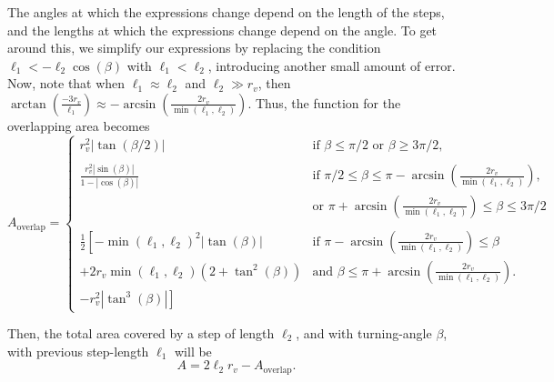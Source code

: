 The angles at which the expressions change depend on the length of the steps, and the lengths at which the expressions change depend on the angle. To get around this, we simplify our expressions by replacing the condition $\ell_1 < -\ell_2 \cos(\beta)$ with $\ell_1 < \ell_2$, introducing another small amount of error. Now, note that when $\ell_1 \approx \ell_2$ and $\ell_2 \gg r_v$, then $\arctan\left( \frac{-3r_v}{\ell_1}\right) \approx -\arcsin\left( \frac{2r_v}{\min(\ell_1,\ell_2)} \right)$. Thus, the function for the overlapping area becomes
\begin{equation*}
A_{\text{overlap}} = 
\begin{cases}
r_v^2 \left|\tan(\beta/2)\right| \quad &\text{if } \beta \leq \pi/2 \text{ or } \beta \geq 3\pi/2,\\\\
\displaystyle \frac{r_v^2 \left|\sin(\beta)\right|}{1-\left|\cos(\beta) \right|} &\text{if } \pi/2  \leq \beta \leq  \pi-\arcsin\left( \frac{2r_v}{\min(\ell_1,\ell_2)} \right),\\
&\text{or }\pi+\arcsin\left( \frac{2r_v}{\min(\ell_1,\ell_2)} \right) \leq \beta \leq 3\pi/2\\\\
\displaystyle \frac{1}{2} \left[-\min(\ell_1,\ell_2)^2 \left|\tan(\beta)\right| \right. &\text{if }\pi-\arcsin\left( \frac{2r_v}{\min(\ell_1,\ell_2)} \right) \leq \beta\\
\left.+ 2r_v \min(\ell_1,\ell_2)(2+\tan^2(\beta))\right.  &\text{and } \beta \leq \pi +\arcsin\left( \frac{2r_v}{\min(\ell_1,\ell_2)} \right).\\
\left. - r_v^2 \left|\tan^3(\beta)\right| \right]   
\end{cases}
\end{equation*}

Then, the total area covered by a step of length $\ell_2$, and with turning-angle $\beta$, with previous step-length $\ell_1$ will be
\begin{equation*}
A = 2\ell_2 r_v - A_{\text{overlap}}.
\end{equation*}